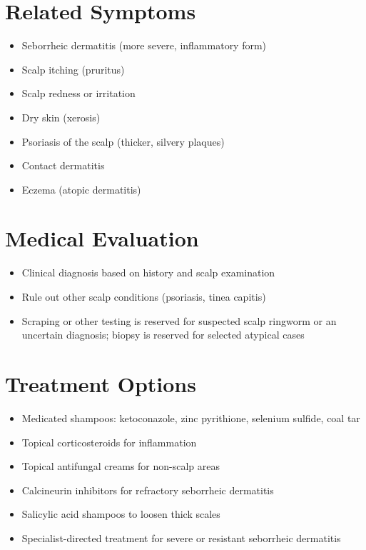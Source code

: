 \section*{Related Symptoms}
\begin{itemize}
\item Seborrheic dermatitis (more severe, inflammatory form)
\item Scalp itching (pruritus)
\item Scalp redness or irritation
\item Dry skin (xerosis)
\item Psoriasis of the scalp (thicker, silvery plaques)
\item Contact dermatitis
\item Eczema (atopic dermatitis)
\end{itemize}

\section*{Medical Evaluation}
\begin{itemize}
\item Clinical diagnosis based on history and scalp examination
\item Rule out other scalp conditions (psoriasis, tinea capitis)
 \item Scraping or other testing is reserved for suspected scalp ringworm or an uncertain diagnosis; biopsy is reserved for selected atypical cases
\end{itemize}

\section*{Treatment Options}
\begin{itemize}
\item Medicated shampoos: ketoconazole, zinc pyrithione, selenium sulfide, coal tar
\item Topical corticosteroids for inflammation
\item Topical antifungal creams for non-scalp areas
\item Calcineurin inhibitors for refractory seborrheic dermatitis
\item Salicylic acid shampoos to loosen thick scales
 \item Specialist-directed treatment for severe or resistant seborrheic dermatitis
\end{itemize}
